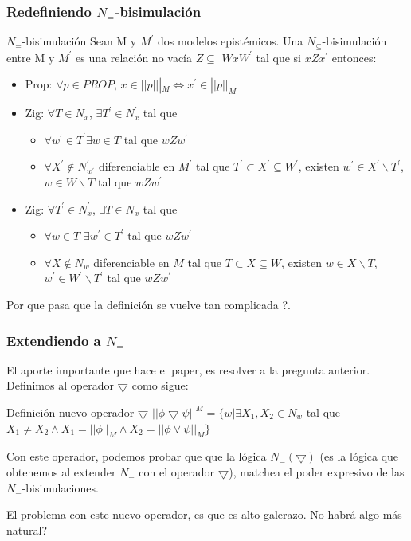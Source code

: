 \documentclass{beamer}
\begin{document}
\begin{frame}
\frametitle{Redefiniendo $N_{=}$-bisimulaci\'on}

\begin{block}{$N_{=}$-bisimulaci\'on}
Sean M y $M^{'}$ dos modelos epist\'emicos. Una $N_{\subseteq}$-bisimulaci\'on entre M y $M^{'}$ es una relaci\'on no vac\'ia $Z \subseteq$ $WxW^{'}$ tal que si $xZx^{'}$ entonces:
\begin{itemize}
\item Prop: $\forall p \in PROP$, $x \in ||p|||_{M} \iff x^{'} \in ||p||_{M^{'}}$
\item Zig: $\forall T \in N_{x}$, $\exists T^{'} \in N^{'}_{x}$ tal que 
\begin{itemize}
\item $\forall w^{'} \in T^{'} \exists w \in T$ tal que $wZw^{'}$
\item $\forall X^{'} \notin N^{'}_{w^{'}}$ diferenciable en $M^{'}$ tal que $T^{'} \subset X^{'} \subseteq W^{'}$, existen $w^{'} \in X^{'} \backslash T^{'}$, $w \in W\backslash T$ tal que $wZw^{'}$
\end{itemize}
\item Zig: $\forall T^{'} \in N_{x}^{'}$, $\exists T \in N_{x}$ tal que 
\begin{itemize}
\item $\forall w \in T$ $\exists w^{'} \in T^{'}$ tal que $wZw^{'}$
\item $\forall X \notin N_{w}$ diferenciable en $M$ tal que $T \subset X \subseteq W$, existen $w \in X \backslash T$, $w^{'} \in W^{'}\backslash T^{'}$ tal que $wZw^{'}$
\end{itemize}  
\end{itemize}
\end{block}

Por que pasa que la definici\'on se vuelve tan complicada ?.

\end{frame}

\begin{frame}
\frametitle{Extendiendo a $N_{=}$}

El aporte importante que hace el paper, es resolver a la pregunta anterior. Definimos al operador $\bigtriangledown$ como sigue:

\begin{block}{Definici\'on nuevo operador $\bigtriangledown$}
$||\phi \bigtriangledown \psi||^{M} = \{w | \exists X_{1}, X_{2} \in N_{w}$ tal que $X_{1} \neq X_{2} \land X_{1} = ||\phi||_{M} \land X_{2} = ||\phi \lor \psi||_{M}\}$
\end{block}

Con este operador, podemos probar que que la l\'ogica $N_{=}(\bigtriangledown)$ (es la l\'ogica que obtenemos al extender $N_{=}$ con el operador $\bigtriangledown$), matchea el poder expresivo de las $N_{=}$-bisimulaciones.

El problema con este nuevo operador, es que es alto galerazo. No habr\'a algo m\'as natural?
\end{frame}
\end{document}
